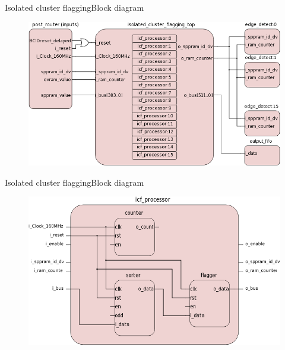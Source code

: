 \documentclass{beamer}
\begin{document}
\begin{frame}{Isolated cluster flagging}{Block diagram}
  \begin{figure}
    \begin{center}
      \includegraphics[height=0.5\textheight]{figs/icf-top}
    \end{center}
  \end{figure}
\end{frame}

\begin{frame}{Isolated cluster flagging}{Block diagram}
  \begin{figure}
    \begin{center}
      \includegraphics[height=0.5\textheight]{figs/icf-processor}
    \end{center}
  \end{figure}
\end{frame}
\end{document}
